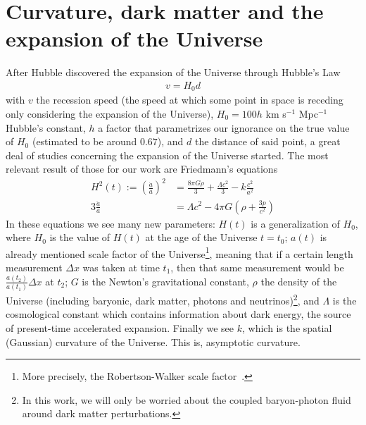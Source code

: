 \section{Curvature, dark matter and the expansion of the Universe}
After Hubble discovered the expansion of the Universe through Hubble's Law \cite{Hubble1929}
\begin{align}
	v = H_0 d
	\label{eq:ley-hubble}
\end{align}
with $v$ the recession speed (the speed at which some point in space is receding only considering the expansion of the Universe), $H_0=100h$ km s$^{-1}$ Mpc$^{-1}$ Hubble's constant, $h$ a factor that parametrizes our ignorance on the true value of $H_0$ (estimated to be around $0.67$), and $d$ the distance of said point, a great deal of studies concerning the expansion of the Universe started. The most relevant result of those for our work are Friedmann's equations \\
\begin{align}
	H^2(t) := \left(\frac{\dot a}{a}\right)^2 &=  \frac{8\pi G \rho}{3} +\frac{\Lambda c^2}{3} - k \frac{c^2}{a^2}
	\label{eq:1a-friedmann}\\
	3 \frac{\ddot a}{a} &= \Lambda c^2 - 4\pi G \left( \rho + \frac{3p}{c^2} \right) 
	\label{eq:2a-friedmann}
\end{align}
In these equations we see many new parameters: $H(t)$ is a generalization of $H_0$, where $H_0$ is the value of $H(t)$ at the age of the Universe $t=t_0$; $a(t)$ is already mentioned scale factor of the Universe\footnote{More precisely, the Robertson-Walker scale factor~\cite{cosmology}.}, meaning that if a certain length measurement $\Delta x$ was taken at time $t_1$, then that same measurement would be $\frac{a(t_2)}{a(t_1)}\Delta x$ at $t_2$; $G$ is the Newton's gravitational constant, $\rho$ the density of the Universe (including baryonic, dark matter, photons and neutrinos)\footnote{In this work, we will only be worried about the coupled baryon-photon fluid around dark matter perturbations.}, and $\Lambda$ is the cosmological constant which contains information about dark energy, the source of present-time accelerated expansion. Finally we see $k$, which is the spatial (Gaussian) curvature of the Universe. This is, asymptotic curvature. \\


